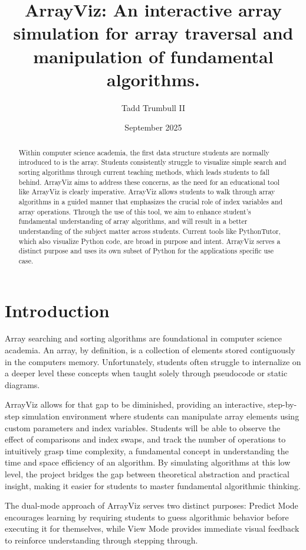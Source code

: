 \documentclass{IEEEtran}
\title{ArrayViz: An interactive array simulation for array traversal and manipulation of fundamental algorithms.}
\author{Tadd Trumbull II}
\date{September 2025}
\begin{document}
\maketitle

\begin{abstract}
Within computer science academia, the first data structure students are normally introduced to is the array. Students consistently struggle to visualize simple search and sorting algorithms through current teaching methods, which leads students to fall behind. ArrayViz aims to address these concerns, as the need for an educational tool like ArrayViz is clearly imperative. ArrayViz allows students to walk through array algorithms in a guided manner that emphasizes the crucial role of index variables and array operations. Through the use of this tool, we aim to enhance student's fundamental understanding of array algorithms, and will result in a better understanding of the subject matter across students. Current tools like PythonTutor, which also visualize Python code, are broad in purpose and intent. ArrayViz serves a distinct purpose and uses its own subset of Python for the applications specific use case.
\end{abstract}

\section{Introduction}
Array searching and sorting algorithms are foundational in computer science academia. An array, by definition, is a collection of elements stored contiguously in the computers memory. Unfortunately, students often struggle to internalize on a deeper level these concepts when taught solely through pseudocode or static diagrams. 

ArrayViz allows for that gap to be diminished, providing an interactive, step-by-step simulation environment where students can manipulate array elements using custom parameters and index variables. Students will be able to observe the effect of comparisons and index swaps, and track the number of operations to intuitively grasp time complexity, a fundamental concept in understanding the time and space efficiency of an algorithm. By simulating algorithms at this low level, the project bridges the gap between theoretical abstraction and practical insight, making it easier for students to master fundamental algorithmic thinking.

The dual-mode approach of ArrayViz serves two distinct purposes: Predict Mode encourages learning by requiring students to guess algorithmic behavior before executing it for themselves, while View Mode provides immediate visual feedback to reinforce understanding through stepping through.
\end{document}
